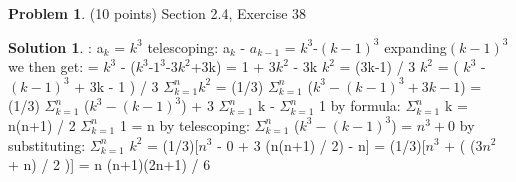\documentclass{article}
\theoremstyle{definition}
\newtheorem{problem}{Problem}
\newtheorem*{solution}{Solution}
\begin{document}
\begin{problem} (10 points) 
Section 2.4, Exercise 38
\end{problem}
\begin{solution}:
\newline
a$_k$ = $k^3$ 
\newline
telescoping: a$_k$ - $a_{k-1}$ = $k^3$-$(k-1)^3$
\newline
expanding$(k-1)^3$ we then get: 
\newline
= $k^3$ - ($k^3$-$1^3$-$3k^2$+3k)
\newline
= 1 + 3$k^2$ - 3k
\newline
$k^2$ = (3k-1) / 3
\newline
$k^2$ = ( $k^3$ - $(k-1)^3$ + 3k - 1 ) / 3
\newline
$\Sigma_{k=1}^n k^2$ = (1/3) $\Sigma_{k=1}^n$ ($k^3 - (k-1)^3 + 3k - 1$)
\newline
= (1/3) $\Sigma_{k=1}^n$ ($k^3 - (k-1)^3$) + 3 $\Sigma_{k=1}^n$ k - $\Sigma_{k=1}^n$ 1
\newline
by formula: 
\newline
$\Sigma_{k=1}^n$ k = n(n+1) / 2
\newline
$\Sigma_{k=1}^n$ 1 = n 
\newline
by telescoping: 
$\Sigma_{k=1}^n$ ($k^3 - (k-1)^3$) = $n^3 + 0$
\newline
by substituting:
$\Sigma_{k=1}^n$ $k^2$ = (1/3)[$n^3$ - 0 + 3 (n(n+1) / 2) - n]
\newline
= (1/3)[$n^3$ + ( (3$n^2$ + n) / 2 )]
\newline
= n (n+1)(2n+1)  / 6 
\end{solution}

\newpage
\end{document}
